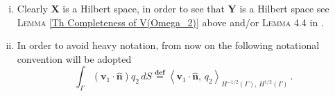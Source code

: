 \documentclass[3p]{elsarticle}
\def\X{\mathbf X}
\def\Y{\mathbf Y}
\def\n{\bm{\widehat{ n} } }
\def\vone{\mathbf{v}_{1}}
\def\qtwo{q_{2}}
\def\defining{\overset{\mathbf{def}} =}
\begin{document}
\begin{remark}\label{Rem notation of the duality product}
%
\begin{enumerate}[(i)]
\item 
Clearly $\X$ is a Hilbert space, in order to see that $\Y$ is a Hilbert space see \textsc{Lemma} \ref{Th Completeness of V(Omega_2)} above and/or \textsc{Lemma} 4.4 in \cite{MoralesNaranjo}.

\item 
In order to avoid heavy notation, from now on the following notational convention will be adopted
%
%
\begin{equation}\label{Eq duality notation full trace}
\int_{\Gamma} \left(\vone\cdot\n\right) \qtwo\, dS \defining 
\left\langle\vone\cdot\n, \, \qtwo\right\rangle_{\scriptscriptstyle H^{-1/2}(\Gamma), \, H^{1/2}(\Gamma)} \, .
\end{equation}
%
\end{enumerate}
%
\end{remark}
\end{document}
